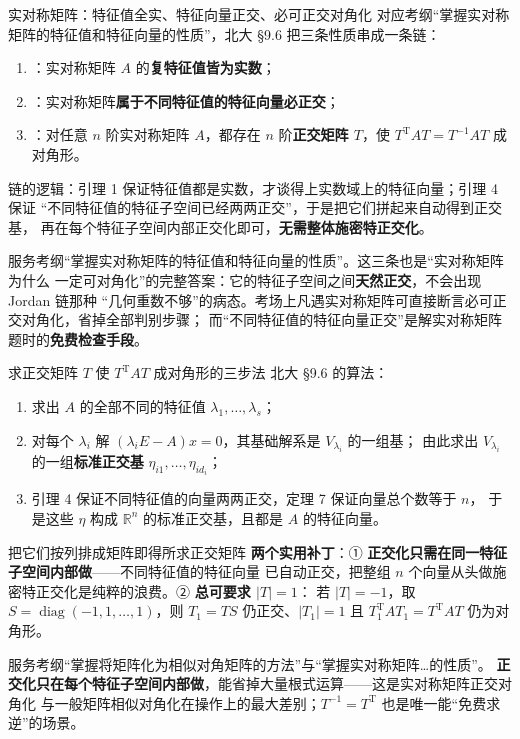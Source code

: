 \begin{fdeep}{实对称矩阵：特征值全实、特征向量正交、必可正交对角化}
对应考纲“掌握实对称矩阵的特征值和特征向量的性质”，北大 §9.6 把三条性质串成一条链：
\begin{enumerate}[leftmargin=2.2em,itemsep=0.2em]
\item {}：实对称矩阵 $A$ 的\textbf{复特征值皆为实数}；
\item {}：实对称矩阵\textbf{属于不同特征值的特征向量必正交}；
\item {}：对任意 $n$ 阶实对称矩阵 $A$，都存在 $n$ 阶\textbf{正交矩阵 $T$}，使
      $T^{\mathrm{T}}AT=T^{-1}AT$ 成对角形。
\end{enumerate}
链的逻辑：引理 1 保证特征值都是实数，才谈得上实数域上的特征向量；引理 4 保证
“不同特征值的特征子空间已经两两正交”，于是把它们拼起来自动得到正交基，
再在每个特征子空间内部正交化即可，\textbf{无需整体施密特正交化}。

\fbref{}服务考纲“掌握实对称矩阵的特征值和特征向量的性质”。这三条也是“实对称矩阵为什么
一定可对角化”的完整答案：它的特征子空间之间\textbf{天然正交}，不会出现 Jordan 链那种
“几何重数不够”的病态。考场上凡遇实对称矩阵可直接断言必可正交对角化，省掉全部判别步骤；
而“不同特征值的特征向量正交”是解实对称矩阵题时的\textbf{免费检查手段}。
\end{fdeep}

\begin{fdeep}{求正交矩阵 $T$ 使 $T^{\mathrm{T}}AT$ 成对角形的三步法}
北大 §9.6 的算法：
\begin{enumerate}[leftmargin=2.2em,itemsep=0.2em]
\item 求出 $A$ 的全部不同的特征值 $\lambda_1,\dots,\lambda_s$；
\item 对每个 $\lambda_i$ 解 $(\lambda_iE-A)x=0$，其基础解系是 $V_{\lambda_i}$ 的一组基；
      由此求出 $V_{\lambda_i}$ 的一组\textbf{标准正交基} $\eta_{i1},\dots,\eta_{id_i}$；
\item 引理 4 保证不同特征值的向量两两正交，定理 7 保证向量总个数等于 $n$，
      于是这些 $\eta$ 构成 $\mathbb{R}^n$ 的标准正交基，且都是 $A$ 的特征向量。
\end{enumerate}
把它们按列排成矩阵即得所求正交矩阵
\textbf{两个实用补丁}：① \textbf{正交化只需在同一特征子空间内部做}——不同特征值的特征向量
已自动正交，把整组 $n$ 个向量从头做施密特正交化是纯粹的浪费。② \textbf{总可要求 $|T|=1$}：
若 $|T|=-1$，取 $S=\operatorname{diag}(-1,1,\dots,1)$，则 $T_1=TS$ 仍正交、$|T_1|=1$
且 $T_1^{\mathrm{T}}AT_1=T^{\mathrm{T}}AT$ 仍为对角形。

\fbref{}服务考纲“掌握将矩阵化为相似对角矩阵的方法”与“掌握实对称矩阵…的性质”。
\textbf{正交化只在每个特征子空间内部做}，能省掉大量根式运算——这是实对称矩阵正交对角化
与一般矩阵相似对角化在操作上的最大差别；$T^{-1}=T^{\mathrm{T}}$ 也是唯一能“免费求逆”的场景。
\end{fdeep}

